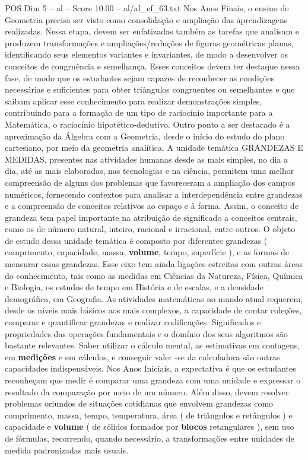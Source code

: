 \begin{textsample}{POS Dim 5 – al – Score 10.00 – al/al\_ef\_63.txt}
Nos Anos Finais, o ensino de Geometria precisa ser visto como consolidação e ampliação das aprendizagens realizadas.
Nessa etapa, devem ser enfatizadas também as tarefas que analisam e produzem transformações e ampliações/reduções de figuras geométricas planas, identificando seus elementos variantes e invariantes, de modo a desenvolver os conceitos de congruência e semelhança.
Esses conceitos devem ter destaque nessa fase, de modo que os estudantes sejam capazes de reconhecer as condições necessárias e suficientes para obter triângulos congruentes ou semelhantes e que saibam aplicar esse conhecimento para realizar demonstrações simples, contribuindo para a formação de um tipo de raciocínio importante para a Matemática, o raciocínio hipotético-dedutivo.
Outro ponto a ser destacado é a aproximação da Álgebra com a Geometria, desde o início do estudo do plano cartesiano, por meio da geometria analítica.
A unidade temática GRANDEZAS E MEDIDAS, presentes nas atividades humanas desde as mais simples, no dia a dia, até as mais elaboradas, nas tecnologias e na ciência, permitem uma melhor compreensão de alguns dos problemas que favoreceram a ampliação dos campos numéricos, fornecendo contextos para analisar a interdependência entre grandezas e a compreensão de conceitos relativos ao espaço e à forma.
Assim, o conceito de grandeza tem papel importante na atribuição de significado a conceitos centrais, como os de número natural, inteiro, racional e irracional, entre outros.
O objeto de estudo dessa unidade temática é composto por diferentes grandezas ( comprimento, capacidade, massa, \textbf{volume}, tempo, superfície ), e as formas de mensurar essas grandezas.
Esse eixo tem ainda ligações estreitas com outras áreas do conhecimento, tais como as medidas em Ciências da Natureza, Física, Química e Biologia, os estudos de tempo em História e de escalas, e a densidade demográfica, em Geografia.
As atividades matemáticas no mundo atual requerem, desde os níveis mais básicos aos mais complexos, a capacidade de contar coleções, comparar e quantificar grandezas e realizar codificações.
Significados e propriedades das operações fundamentais e o domínio dos seus algoritmos são bastante relevantes.
Saber utilizar o cálculo mental, as estimativas em contagens, em \textbf{medições} e em cálculos, e conseguir valer -se da calculadora são outras capacidades indispensáveis.
Nos Anos Iniciais, a expectativa é que os estudantes reconheçam que medir é comparar uma grandeza com uma unidade e expressar o resultado da comparação por meio de um número.
Além disso, devem resolver problemas oriundos de situações cotidianas que envolvem grandezas como comprimento, massa, tempo, temperatura, área ( de triângulos e retângulos ) e capacidade e \textbf{volume} ( de sólidos formados por \textbf{blocos} retangulares ), sem uso de fórmulas, recorrendo, quando necessário, a transformações entre unidades de medida padronizadas mais usuais.

\end{textsample}
